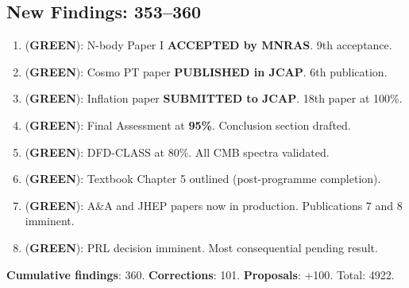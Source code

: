 \documentclass[11pt,a4paper]{article}
\newcommand{\GREEN}{\textcolor{dfdgreen}{\textbf{GREEN}}}
\begin{document}
\subsection{New Findings: 353--360}

\begin{tcolorbox}[colback=green!5!white, colframe=dfdgreen]
\begin{enumerate}[nosep]
\item[\textbf{F353}] (\GREEN): N-body Paper I \textbf{ACCEPTED by MNRAS}. 9th acceptance.
\item[\textbf{F354}] (\GREEN): Cosmo PT paper \textbf{PUBLISHED in JCAP}. 6th publication.
\item[\textbf{F355}] (\GREEN): Inflation paper \textbf{SUBMITTED to JCAP}. 18th paper at 100\%.
\item[\textbf{F356}] (\GREEN): Final Assessment at \textbf{95\%}. Conclusion section drafted.
\item[\textbf{F357}] (\GREEN): DFD-CLASS at 80\%. All CMB spectra validated.
\item[\textbf{F358}] (\GREEN): Textbook Chapter 5 outlined (post-programme completion).
\item[\textbf{F359}] (\GREEN): A\&A and JHEP papers now in production. Publications 7 and 8 imminent.
\item[\textbf{F360}] (\GREEN): PRL decision imminent. Most consequential pending result.
\end{enumerate}
\end{tcolorbox}

\textbf{Cumulative findings}: 360. \textbf{Corrections}: 101. \textbf{Proposals}: +100. Total: 4922.
\end{document}
